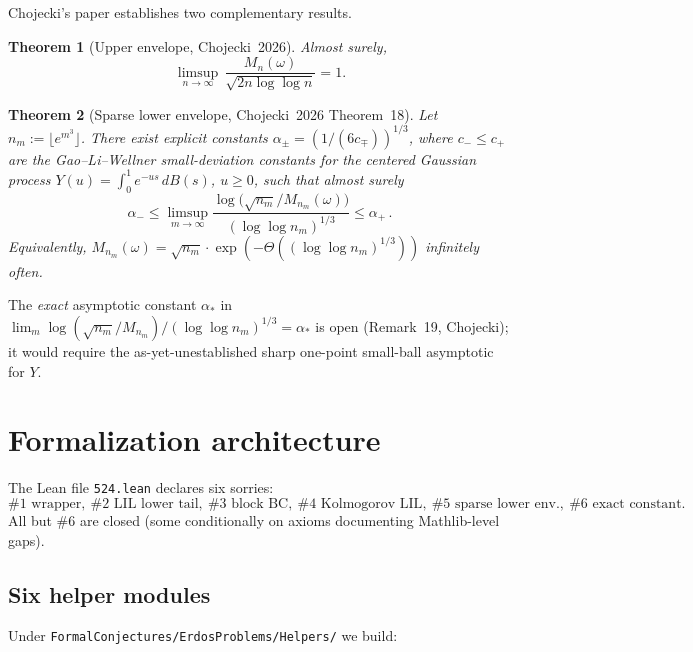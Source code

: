 \documentclass[11pt]{article}
\theoremstyle{plain}
\newtheorem{theorem}{Theorem}
\theoremstyle{definition}
\theoremstyle{remark}
\newcommand{\supnorm}{M}
\DeclareMathOperator*{\limsupop}{\limsup}
\begin{document}
Chojecki's paper establishes two complementary results.

\begin{theorem}[Upper envelope, Chojecki~2026]\label{thm:UE}
Almost surely,
\[
  \limsupop_{n\to\infty}\, \frac{\supnorm_n(\omega)}{\sqrt{2n\log\log n}}
  = 1.
\]
\end{theorem}

\begin{theorem}[Sparse lower envelope, Chojecki~2026 Theorem~18]\label{thm:SLE}
Let $n_m := \lfloor e^{m^3}\rfloor$. There exist explicit constants
$\alpha_\pm = (1/(6c_\mp))^{1/3}$, where $c_- \le c_+$ are the
Gao–Li–Wellner small-deviation constants for the centered Gaussian
process $Y(u) = \int_0^1 e^{-us}\,dB(s)$, $u \ge 0$, such that almost
surely
\[
  \alpha_- \le \limsupop_{m\to\infty}
  \frac{\log\!\big(\sqrt{n_m}/\supnorm_{n_m}(\omega)\big)}
       {(\log\log n_m)^{1/3}} \le \alpha_+ \,.
\]
Equivalently, $\supnorm_{n_m}(\omega) = \sqrt{n_m}\cdot
\exp(-\Theta((\log\log n_m)^{1/3}))$ infinitely often.
\end{theorem}

The \emph{exact} asymptotic constant $\alpha_*$ in
$\lim_m \log(\sqrt{n_m}/\supnorm_{n_m})/(\log\log n_m)^{1/3} = \alpha_*$
is open (Remark~19, Chojecki); it would require the as-yet-unestablished
sharp one-point small-ball asymptotic for $Y$.

\section{Formalization architecture}

The Lean file \texttt{524.lean} declares six sorries:
\[
  \text{\#1 wrapper},\ \text{\#2 LIL lower tail},\ \text{\#3 block BC},\
  \text{\#4 Kolmogorov LIL},\ \text{\#5 sparse lower env.},\ \text{\#6 exact constant}.
\]
All but \#6 are closed (some conditionally on axioms documenting
Mathlib-level gaps).

\subsection{Six helper modules}

Under \texttt{FormalConjectures/ErdosProblems/Helpers/} we build:
\end{document}
